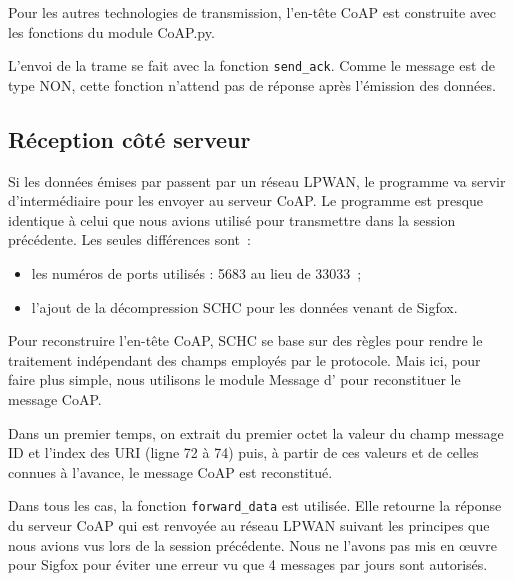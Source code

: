          \vspace{1em}

Pour les autres technologies de transmission, l'en-tête CoAP est construite avec les fonctions du module CoAP.py.


L'envoi de la trame se fait avec la fonction \texttt{send\_ack}. Comme le message est de type NON, cette fonction n'attend pas de réponse après l'émission des données.

\subsection{Réception côté serveur}

Si les données émises par  passent par un réseau LPWAN, le programme  va servir d'intermédiaire pour les envoyer au serveur CoAP. Le programme est presque identique à celui que nous avions utilisé pour transmettre dans la session précédente. Les seules différences sont~:
\begin{itemize}
    \item les numéros de ports utilisés : 5683 au lieu de 33033~;
    \item l'ajout de la décompression SCHC pour les données venant de Sigfox.
\end{itemize}


Pour reconstruire l'en-tête CoAP, SCHC se base sur des règles pour rendre le traitement indépendant des champs employés par le protocole. Mais ici, pour faire plus simple, nous utilisons le module Message d' pour reconstituer le message CoAP.

Dans un premier temps, on extrait du premier octet la valeur du champ message ID et l'index des URI (ligne 72 à 74) puis, à partir de ces valeurs et de celles connues à l'avance, le message CoAP est reconstitué.

         \vspace{1em}

Dans tous les cas, la fonction \texttt{forward\_data} est utilisée. Elle retourne la réponse du serveur CoAP qui est renvoyée au réseau LPWAN suivant les principes que nous avions vus lors de la session précédente. Nous ne l'avons pas mis en œuvre pour Sigfox pour éviter une erreur vu que 4 messages par jours sont autorisés.


